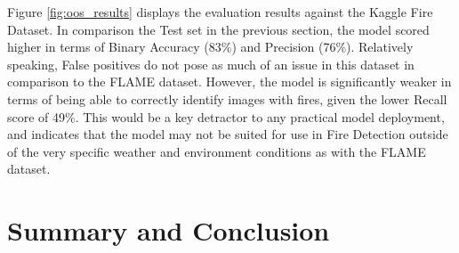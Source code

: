 \documentclass[a4paper,11pt]{article} %
\begin{document}
Figure \ref{fig:oos_results} displays the evaluation results against the Kaggle Fire Dataset. In comparison the Test set
in the previous section, the model scored higher in terms of Binary Accuracy (83\%) and Precision (76\%). Relatively speaking,
False positives do not pose as much of an issue in this dataset in comparison to the FLAME dataset. However, the model is significantly 
weaker in terms of being able to correctly identify images with fires, given the lower Recall score of 49\%. This would 
be a key detractor to any practical model deployment, and indicates that the model may not be suited for use in Fire Detection
outside of the very specific weather and environment conditions as with the FLAME dataset.

\section{Summary and Conclusion}
\blindtext

\printbibliography
\end{document}
